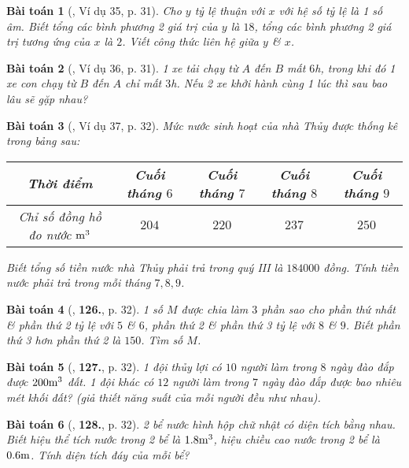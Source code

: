 \documentclass{article}
\numberwithin{equation}{section}
\newtheorem{baitoan}{Bài toán}
\begin{document}
\begin{baitoan}[\cite{Tuyen_Toan_7}, Ví dụ 35, p. 31]
	Cho $y$ tỷ lệ thuận với $x$ với hệ số tỷ lệ là 1 số âm. Biết tổng các bình phương 2 giá trị của $y$ là $18$, tổng các bình phương 2 giá trị tương ứng của $x$ là $2$. Viết công thức liên hệ giữa $y$ \& $x$.
\end{baitoan}

\begin{baitoan}[\cite{Tuyen_Toan_7}, Ví dụ 36, p. 31]
	1 xe tải chạy từ $A$ đến $B$ mất $6$\emph{h}, trong khi đó 1 xe con chạy từ $B$ đến $A$ chỉ mất $3$\emph{h}. Nếu 2 xe khởi hành cùng 1 lúc thì sau bao lâu sẽ gặp nhau?
\end{baitoan}

\begin{baitoan}[\cite{Tuyen_Toan_7}, Ví dụ 37, p. 32]
	Mức nước sinh hoạt của nhà Thủy được thống kê trong bảng sau:
	
	\begin{table}[H]
		\centering
		\begin{tabular}{|c|c|c|c|c|}
			\hline
			Thời điểm & Cuối tháng $6$ & Cuối tháng $7$ & Cuối tháng $8$ & Cuối tháng $9$ \\
			\hline
			Chỉ số đồng hồ đo nước $\rm m^3$ & $204$ & $220$ & $237$ & $250$ \\
			\hline
		\end{tabular}
	\end{table}
	Biết tổng số tiền nước nhà Thủy phải trả trong quý III là $184000$ đồng. Tính tiền nước phải trả trong mỗi tháng $7,8,9$.
\end{baitoan}

\begin{baitoan}[\cite{Tuyen_Toan_7}, \textbf{126.}, p. 32]
	1 số $M$ được chia làm $3$ phần sao cho phần thứ nhất \& phần thứ 2 tỷ lệ với $5$ \& $6$, phần thứ 2 \& phần thứ 3 tỷ lệ với $8$ \& $9$. Biết phần thứ 3 hơn phần thứ 2 là $150$. Tìm số $M$.
\end{baitoan}
	
\begin{baitoan}[\cite{Tuyen_Toan_7}, \textbf{127.}, p. 32]
	1 đội thủy lợi có $10$ người làm trong $8$ ngày đào đắp được $\rm200m^3$ đất. 1 đội khác có $12$ người làm trong $7$ ngày đào đắp được bao nhiêu mét khối đất? (giả thiết năng suất của mỗi người đều như nhau).
\end{baitoan}

\begin{baitoan}[\cite{Tuyen_Toan_7}, \textbf{128.}, p. 32]
	2 bể nước hình hộp chữ nhật có diện tích bằng nhau. Biết hiệu thể tích nước trong 2 bể là $\rm1.8m^3$, hiệu chiều cao nước trong 2 bể là $\rm0.6m$. Tính diện tích đáy của mỗi bể?
\end{baitoan}
\end{document}
